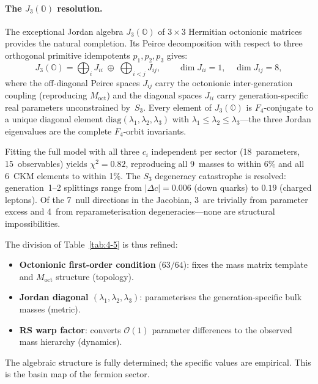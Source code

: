 \paragraph{The $J_3(\mathbb{O})$ resolution.}
The exceptional Jordan algebra $J_3(\mathbb{O})$ of $3 \times 3$ Hermitian octonionic matrices provides the natural completion. Its Peirce decomposition with respect to three orthogonal primitive idempotents $p_1, p_2, p_3$ gives:
\begin{equation}
  J_3(\mathbb{O}) = \bigoplus_{i} J_{ii} \;\oplus\; \bigoplus_{i < j} J_{ij}, \qquad
  \dim J_{ii} = 1, \quad \dim J_{ij} = 8,
  \label{eq:4-peirce}
\end{equation}
where the off-diagonal Peirce spaces $J_{ij}$ carry the octonionic inter-generation coupling (reproducing $M_{\mathrm{oct}}$) and the diagonal spaces $J_{ii}$ carry generation-specific real parameters unconstrained by~$S_3$. Every element of $J_3(\mathbb{O})$ is $F_4$-conjugate to a unique diagonal element $\mathrm{diag}(\lambda_1, \lambda_2, \lambda_3)$ with $\lambda_1 \leq \lambda_2 \leq \lambda_3$---the three Jordan eigenvalues are the complete $F_4$-orbit invariants.

Fitting the full model with all three $c_i$ independent per sector (18~parameters, 15~observables) yields $\chi^2 = 0.82$, reproducing all 9~masses to within 6\% and all 6~CKM elements to within 1\%. The $S_3$ degeneracy catastrophe is resolved: generation~1--2 splittings range from $|\Delta c| = 0.006$ (down quarks) to $0.19$ (charged leptons). Of the 7~null directions in the Jacobian, 3~are trivially from parameter excess and 4~from reparameterisation degeneracies---none are structural impossibilities.

The division of Table~\ref{tab:4-5} is thus refined:
\begin{itemize}
  \item \textbf{Octonionic first-order condition} ($63/64$): fixes the mass matrix template and $M_{\mathrm{oct}}$ structure (topology).
  \item \textbf{Jordan diagonal $(\lambda_1, \lambda_2, \lambda_3)$}: parameterises the generation-specific bulk masses (metric).
  \item \textbf{RS warp factor}: converts $\mathcal{O}(1)$ parameter differences to the observed mass hierarchy (dynamics).
\end{itemize}
The algebraic structure is fully determined; the specific values are empirical. This is the basin map of the fermion sector.

